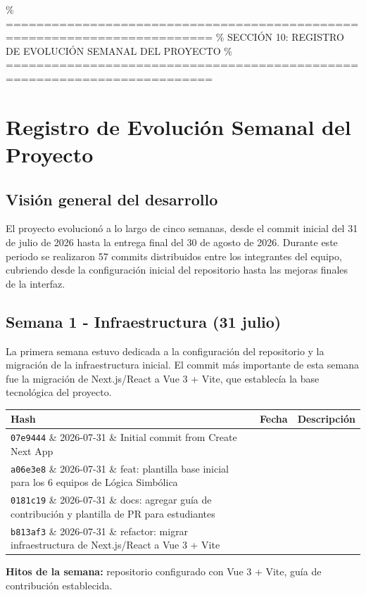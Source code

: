 \documentclass[11pt,a4paper]{article}
\begin{document}
\newpage

\% =========================================================================
\% SECCIÓN 10: REGISTRO DE EVOLUCIÓN SEMANAL DEL PROYECTO
\% =========================================================================
\section{Registro de Evolución Semanal del Proyecto}

\subsection{Visión general del desarrollo}
El proyecto evolucionó a lo largo de cinco semanas, desde el commit inicial del 31 de julio de 2026 hasta la entrega final del 30 de agosto de 2026. Durante este periodo se realizaron 57 commits distribuidos entre los integrantes del equipo, cubriendo desde la configuración inicial del repositorio hasta las mejoras finales de la interfaz.

\subsection{Semana 1 - Infraestructura (31 julio)}
La primera semana estuvo dedicada a la configuración del repositorio y la migración de la infraestructura inicial. El commit más importante de esta semana fue la migración de Next.js/React a Vue 3 + Vite, que establecía la base tecnológica del proyecto.

\begin{table}[htbp]
\centering
\small
\begin{tabularx}{\textwidth}{llX}
\toprule
\textbf{Hash} & \textbf{Fecha} & \textbf{Descripción} \\
\midrule
\texttt{07e9444} \& 2026-07-31 \& Initial commit from Create Next App \\
\texttt{a06e3e8} \& 2026-07-31 \& feat: plantilla base inicial para los 6 equipos de Lógica Simbólica \\
\texttt{0181c19} \& 2026-07-31 \& docs: agregar guía de contribución y plantilla de PR para estudiantes \\
\texttt{b813af3} \& 2026-07-31 \& refactor: migrar infraestructura de Next.js/React a Vue 3 + Vite \\
\bottomrule
\end{tabularx}
\end{table}
\textbf{Hitos de la semana:} repositorio configurado con Vue 3 + Vite, guía de contribución establecida.
\end{document}
